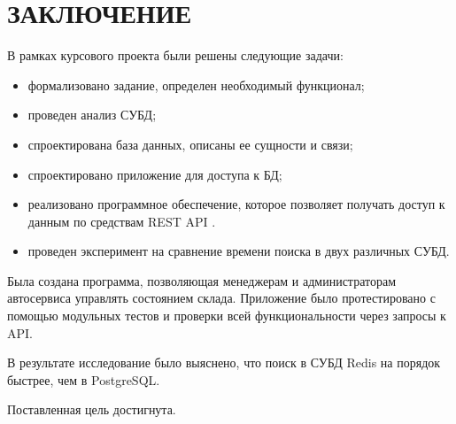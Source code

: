 \chapter*{ЗАКЛЮЧЕНИЕ}

В рамках курсового проекта были решены следующие задачи:
\begin{itemize}
	\item формализовано задание, определен необходимый функционал;
	\item проведен анализ СУБД; 
	\item спроектирована база данных, описаны ее сущности и связи;
	\item спроектировано приложение для доступа к БД;
	\item реализовано программное обеспечение, которое позволяет получать доступ к данным по средствам REST API \cite{rest-api}.
	\item проведен эксперимент на сравнение времени поиска в двух различных СУБД.
\end{itemize}

Была создана программа, позволяющая менеджерам и администраторам автосервиса управлять состоянием склада. Приложение было протестировано с помощью модульных тестов и проверки всей функциональности через запросы к API.

В результате исследование было выяснено, что поиск в СУБД Redis на порядок быстрее, чем в PostgreSQL.

Поставленная цель достигнута.